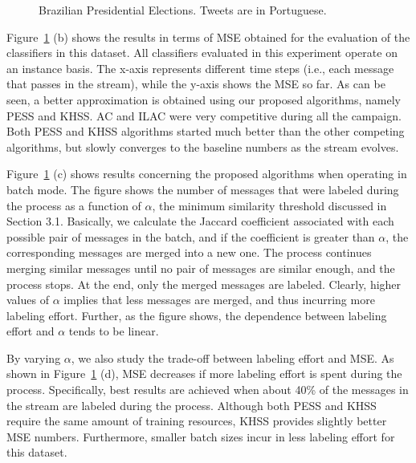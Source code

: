 \begin{figure}[htb]
\caption{Brazilian Presidential Elections. Tweets are in Portuguese.}
\label{fig:dilma}
\end{figure}

Figure~\ref{fig:dilma} (b) shows the results in terms of MSE obtained for the evaluation of the classifiers in this dataset. All classifiers evaluated in this experiment operate on an instance basis.
The x-axis represents different time steps (i.e., each message that
passes in the stream), while the y-axis shows the MSE so far.
As can be seen, a better approximation is obtained using our proposed algorithms, namely PESS and KHSS.
AC and ILAC were very competitive during all the campaign. Both PESS and KHSS algorithms started much better than the other competing algorithms, but slowly converges to the baseline numbers as the stream evolves.

Figure~\ref{fig:dilma} (c) shows results concerning the proposed algorithms when operating in batch mode. The figure shows the number of messages that were labeled during the process as a function of $\alpha$, the minimum similarity threshold discussed in Section 3.1. Basically, we calculate the Jaccard coefficient associated with each possible pair of messages in the batch, and if the coefficient is greater than $\alpha$, the corresponding messages are merged into a new one. The process continues merging similar messages until no pair of messages are similar enough, and the process stops. At the end, only the merged messages are labeled. Clearly, higher values of $\alpha$ implies that less messages are merged, and thus incurring more labeling effort. Further, as the figure shows, the dependence between labeling effort and $\alpha$ tends to be linear.

By varying $\alpha$, we also study the trade-off between labeling effort and MSE. As shown in Figure~\ref{fig:dilma} (d), MSE decreases if more labeling effort is spent during the process. Specifically, best results are achieved when about 40\% of the messages in the stream are labeled during the process. Although both PESS and KHSS require the same amount of training resources, KHSS provides slightly better MSE numbers. Furthermore, smaller batch sizes incur in less labeling effort for this dataset.

